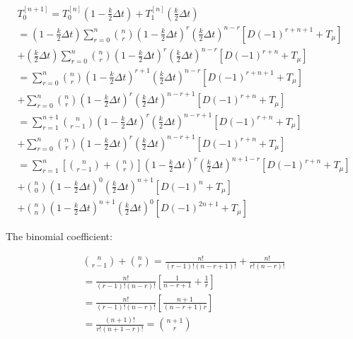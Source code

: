 \documentclass{article}
\begin{document}
\begin{equation*}
\begin{split}
        T_0^{[n+1]} = T_0^{[n]}\left(1-\frac{k}{2}\Delta t\right)+T_1^{[n]}\left(\frac{k}{2}\Delta t \right) \\  = \left(1-\frac{k}{2}\Delta t\right) \sum_{r=0}^{n}\binom{n}{r}\left(1-\frac{k}{2}\Delta t\right)^r\left(\frac{k}{2}\Delta t\right)^{n-r}\left[D(-1)^{r+n+1}+T_\mu\right] \\ + \left(\frac{k}{2}\Delta t\right) \sum_{r=0}^{n}\binom{n}{r}\left(1-\frac{k}{2}\Delta t\right)^r\left(\frac{k}{2}\Delta t\right)^{n-r}\left[D(-1)^{r+n}+T_\mu\right] \\  = \sum_{r=0}^{n}\binom{n}{r}\left(1-\frac{k}{2}\Delta t\right)^{r+1}\left(\frac{k}{2}\Delta t\right)^{n-r}\left[D(-1)^{r+n+1}+T_\mu\right] \\ +  \sum_{r=0}^{n}\binom{n}{r}\left(1-\frac{k}{2}\Delta t\right)^r\left(\frac{k}{2}\Delta t\right)^{n-r+1}\left[D(-1)^{
        r+n}+T_\mu\right] \\  = \sum_{r=1}^{n+1}\binom{n}{r-1}\left(1-\frac{k}{2}\Delta t\right)^{r}\left(\frac{k}{2}\Delta t\right)^{n-r+1}\left[D(-1)^{r+n}+T_\mu\right] \\ +  \sum_{r=0}^{n}\binom{n}{r}\left(1-\frac{k}{2}\Delta t\right)^r\left(\frac{k}{2}\Delta t\right)^{n-r+1}\left[D(-1)^{r+n}+T_\mu\right] \\  = \sum_{r=1}^{n}\left[\binom{n}{r-1}+\binom{n}{r}\right]\left(1-\frac{k}{2}\Delta t\right)^{r}\left(\frac{k}{2}\Delta t\right)^{n+1-r}\left[D(-1)^{r+n}+T_\mu\right] \\ +  \binom{n}{0}\left(1-\frac{k}{2}\Delta t\right)^0\left(\frac{k}{2}\Delta t\right)^{n+1}\left[D(-1)^{n}+T_\mu\right] \\ + \binom{n}{n}\left(1-\frac{k}{2}\Delta t\right)^{n+1}\left(\frac{k}{2}\Delta t\right)^{0}\left[D(-1)^{2n+1}+T_\mu\right]
\end{split}
\end{equation*}

The binomial coefficient:

\begin{equation*}
\begin{split}
        \binom{n}{r-1}+\binom{n}{r} = \frac{n!}{(r-1)!(n-r+1)!}+\frac{n!}{r!(n-r)!} \\=
        \frac{n!}{(r-1)!(n-r)!}\left[\frac{1}{n-r+1}+\frac{1}{r}\right]
        \\=
        \frac{n!}{(r-1)!(n-r)!}\left[\frac{n+1}{(n-r+1)r}\right]
        \\=
        \frac{(n+1)!}{r!(n+1-r)!}=\binom{n+1}{r}
\end{split}
\end{equation*}
\end{document}
